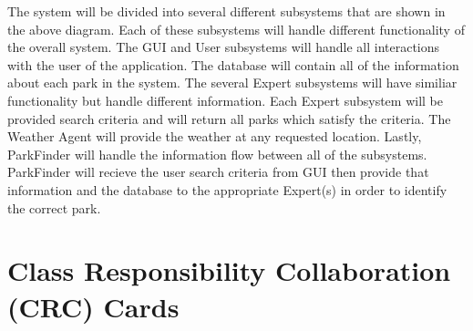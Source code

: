 \documentclass[titlepage,12pt]{article}
\begin{document}
The system will be divided into several different subsystems that are shown in the above diagram. 
Each of these subsystems will handle different functionality of the overall system. The GUI and User subsystems will handle all interactions with the user of the application. The database will contain all
of the information about each park in the system. The several Expert subsystems will have similiar 
functionality but handle different information. Each Expert subsystem will be provided search criteria 
and will return all parks which satisfy the criteria. The Weather Agent will provide the weather at any
requested location. Lastly, ParkFinder will handle the information flow between all of the subsystems.
ParkFinder will recieve the user search criteria from GUI then provide that information and the database to the appropriate Expert(s) in order to identify the correct park.   



    
\section{Class Responsibility Collaboration (CRC) Cards}
\label{sec:class_responsibility_collaboration_crc_cards}

%
%    
\end{document}
